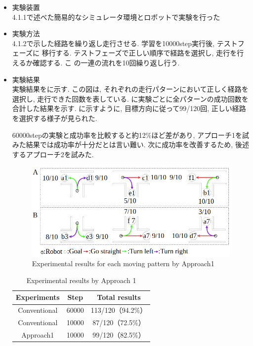 \begin{itemize}
  \item 実験装置\\
  4.1.1で述べた簡易的なシミュレータ環境とロボットで実験を行った
  \item 実験方法\\
  4.1.2で示した経路を繰り返し走行させる. 学習を10000step実行後, テストフェーズに
  移行する. テストフェーズで正しい順序で経路を選択し, 走行を行えるか確認する. こ
  の一連の流れを10回繰り返し行う.
  \newpage
  \item 実験結果\\
  実験結果をに示す. この図は, それぞれの走行パターンにおいて正しく経路を選択し, 走行できた回数を表している. に実験ごとに全パターンの成功回数を合計した結果を示す. 
  に示すように, 目標方向に従って99/120回, 正しい経路を選択する様子が見られた. 
  \par
  60000stepの実験と成功率を比較すると約12\%ほど差があり, アプローチ1を試みた結果では成功率が十分だとは言い難い. 次に成功率を改善するため, 後述するアプローチ2を試みた.

  \vspace{0.5cm}

  \begin{figure}[hbtp]
    \centering
   \includegraphics[keepaspectratio, scale=0.5]
        {images/10000step_act1.0.png}
   \caption{Experimental results for each moving pattern by Approach1}
   \label{Fig:10000step_act1.0}
  \end{figure}  
  
  \vspace{0.5cm}

  \begin{table}[hbtp]
    \caption{Experimental results by Approach 1}
    \label{table:result3}
    \centering
    \begin{tabular}{|c|c|c|}
      \hline
      Experiments & Step & Total results\\
      \hline
      Conventional & 60000 & 113/120（94.2\%）\\
      \hline
      Conventional & 10000 & 87/120（72.5\%）\\
      \hline
      Approach1 & 10000 & 99/120（82.5\%）\\
      \hline
    \end{tabular}
  \end{table}

\end{itemize}

